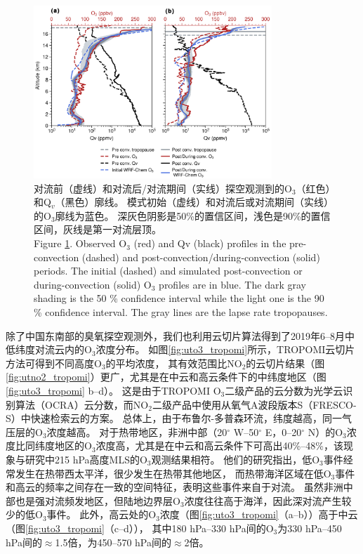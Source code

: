 \begin{figure}[!htbp]
\centering
\includegraphics[width=0.8\textwidth]{./figures/ozonesonde_profile.png}
\caption{对流前（虚线）和对流后/对流期间（实线）探空观测到的O$_3$（红色）和Q$_v$（黑色）廓线。
模式初始（虚线）和对流后或对流期间（实线）的O$_3$廓线为蓝色。
深灰色阴影是50\%的置信区间，浅色是90\%的置信区间，灰线是第一对流层顶。\\
Figure \ref{fig:ozonesonde_profile}. Observed O$_3$ (red) and Qv (black) profiles in the pre-convection (dashed) and post-convection/during-convection (solid) periods.
The initial (dashed) and simulated post-convection or during-convection (solid) O$_3$ profiles are in blue.
The dark gray shading is the 50 \% confidence interval while the light one is the 90 \% confidence interval.
The gray lines are the lapse rate tropopauses.
}
\label{fig:ozonesonde_profile}
\end{figure}


除了中国东南部的臭氧探空观测外，我们也利用云切片算法得到了2019年6--8月中低纬度对流云内的O$_3$浓度分布。
如图\ref{fig:uto3_tropomi}所示，TROPOMI云切片方法可得到不同高度O$_3$的平均浓度，
其有效范围比NO$_2$的云切片结果（图\ref{fig:utno2_tropomi}）更广，尤其是在中云和高云条件下的中纬度地区（图\ref{fig:uto3_tropomi} b--d）。
这是由于TROPOMI O$_3$二级产品的云分数为光学云识别算法（OCRA）云分数，而NO$_2$二级产品中使用从氧气A波段版本S（FRESCO-S）中快速检索云的方案。
总体上，由于布鲁尔-多普森环流，纬度越高，同一气压层的O$_3$浓度越高。
对于热带地区，非洲中部（20$^{\circ}$ W--50$^{\circ}$ E，0--20$^{\circ}$ N）的O$_3$浓度比同纬度地区的O$_3$浓度高，尤其是在中云和高云条件下可高出40\%--48\%，该现象与\citet{Cooper.2013}研究中215 hPa高度MLS的O$_3$观测结果相符。
他们的研究指出，低O$_3$事件经常发生在热带西太平洋，很少发生在热带其他地区，
而热带海洋区域在低O$_3$事件和高云的频率之间存在一致的空间特征，表明这些事件来自于对流。
虽然非洲中部也是强对流频发地区，但陆地边界层O$_3$浓度往往高于海洋，因此深对流产生较少的低O$_3$事件。
此外，高云处的O$_3$浓度（图\ref{fig:uto3_tropomi}（a--b））高于中云（图\ref{fig:uto3_tropomi}（c--d）），
其中180 hPa--330 hPa间的O$_3$为330 hPa--450 hPa间的$\approx$1.5倍，为450--570 hPa间的$\approx$2倍。

